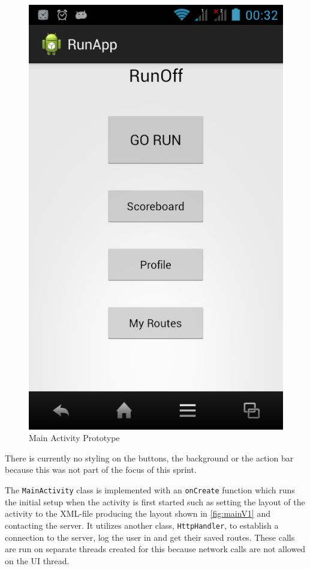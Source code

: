 \begin{figure}[ht]
\begin{center}
 \caption{Main Activity Prototype}
 \label{fig:mainV1}
 \includegraphics[scale=0.4]{img/mainV1.png}
\end{center}
\end{figure}

There is currently no styling on the buttons, the background or the action bar because this was not part of the focus of this sprint. 
\vspace{10pt}

The \texttt{MainActivity} class is implemented with an \texttt{onCreate} function which runs the initial setup when the activity is first started such as setting the layout of the activity to the \ac{XML}-file producing the layout shown in \autoref{fig:mainV1} and contacting the server. It utilizes another class, \texttt{HttpHandler}, to establish a connection to the server, log the user in and get their saved routes. These calls are run on separate threads created for this because network calls are not allowed on the \ac{UI} thread. 
\vspace{10pt}

